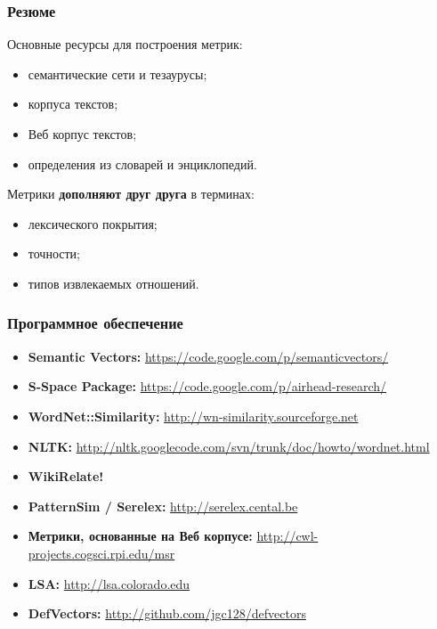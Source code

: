 \begin{frame}
\frametitle{Резюме}

\begin{block}{Основные ресурсы для построения метрик:}
\begin{itemize}
  \item семантические сети и тезаурусы;
  \item корпуса текстов;
  \item Веб корпус текстов;
  \item определения из словарей и энциклопедий. 
\end{itemize}
\end{block}   


\begin{block}{Метрики \textbf{дополняют друг друга} в терминах:}
\begin{itemize}
  \item лексического покрытия;
  \item точности;
  \item типов извлекаемых отношений. 
\end{itemize}
\end{block}   

\end{frame}





\begin{frame}
\frametitle{Программное обеспечение}

\begin{itemize}
  \item \textbf{Semantic Vectors:} \url{https://code.google.com/p/semanticvectors/}
  \item \textbf{S-Space Package:} \url{https://code.google.com/p/airhead-research/}
  \item \textbf{WordNet::Similarity:} \url{http://wn-similarity.sourceforge.net}
  \item \textbf{NLTK:} \url{http://nltk.googlecode.com/svn/trunk/doc/howto/wordnet.html}
  \item \textbf{WikiRelate!}
  \item \textbf{PatternSim / Serelex:} \url{http://serelex.cental.be}
  \item \textbf{Метрики, основанные на Веб корпусе:} \url{http://cwl-projects.cogsci.rpi.edu/msr}
  \item \textbf{LSA:} \url{http://lsa.colorado.edu}
  \item \textbf{DefVectors:} \url{http://github.com/jgc128/defvectors}
\end{itemize}

\end{frame}
